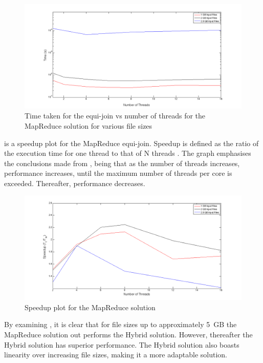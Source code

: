 \documentclass[12pt,twocolumn]{witseiepaper}
\begin{document}
\begin{figure}[h]
	\centering
	\includegraphics[width=1\columnwidth]{mapReduceTimevsThreads.png}
	\caption{Time taken for the equi-join vs number of threads for the MapReduce solution for various file sizes}
	\raggedright
	\label{fig:resultsMR}	
\end{figure}

 is a speedup plot for the MapReduce equi-join. Speedup is defined as the ratio of the execution time for one thread to that of N threads \cite{speedup}. The graph emphasises the conclusions made from , being that as the number of threads increases, performance increases, until the maximum number of threads per core is exceeded. Thereafter, performance decreases.

\begin{figure}[h]
	\centering
	\includegraphics[width=1\columnwidth]{mapReduceSpeedup.png}
	\caption{Speedup plot for the MapReduce solution}
	\raggedright
	\label{fig:speedUpMR}	
\end{figure}

By examining , it is clear that for file sizes up to approximately 5~GB the MapReduce solution out performs the Hybrid solution. However, thereafter the Hybrid solution has superior performance. The Hybrid solution also boasts linearity over increasing file sizes, making it a more adaptable solution.
\end{document}

